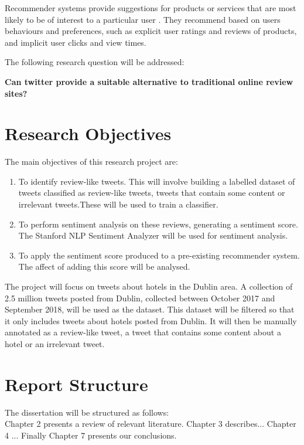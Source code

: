 Recommender systems provide suggestions for products or services that are most likely to be of interest to a particular user \cite{Ricci2015}. They recommend based on users behaviours and preferences, such as explicit user ratings and reviews of products, and implicit user clicks and view times.

The following research question will be addressed:

\textbf{Can twitter provide a suitable alternative to traditional online review sites?}\\

\section{Research Objectives}
The main objectives of this research project are:
\begin{enumerate}
    \item To identify review-like tweets. This will involve building a labelled dataset of tweets classified as review-like tweets, tweets that contain some content or irrelevant tweets.These will be used to train a classifier.
    \item To perform sentiment analysis on these reviews, generating a sentiment score. The Stanford NLP Sentiment Analyzer will be used for sentiment analysis. 
    \item To apply the sentiment score produced to a pre-existing recommender system. The affect of adding this score will be analysed.
\end{enumerate}
The project will focus on tweets about hotels in the Dublin area. A collection of 2.5 million tweets posted from Dublin, collected between October 2017 and September 2018, will be used as the dataset. This dataset will be filtered so that it only includes tweets about hotels posted from Dublin. It will then be manually annotated as a review-like tweet, a tweet that contains some content about a hotel or an irrelevant tweet.

\section{Report Structure}
The dissertation will be structured as follows:\\
Chapter 2 presents a review of relevant literature. Chapter 3 describes... Chapter 4 ... Finally Chapter 7 presents our conclusions.